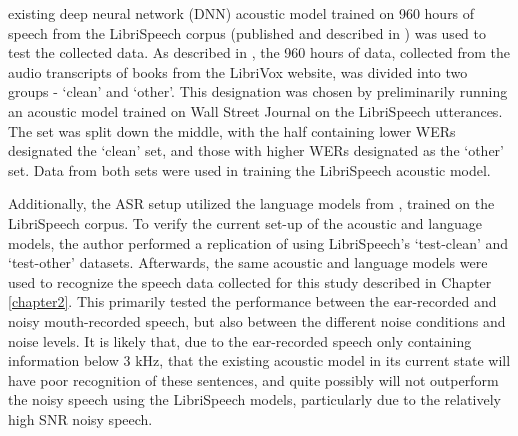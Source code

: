 \DIFdelbegin {}\DIFdelend \DIFaddbegin {}\DIFaddend existing deep neural network (DNN) acoustic model trained on 960 hours of speech from the LibriSpeech corpus (published and described in \cite{panayotov:15}) was used to test the collected data.  As described in \cite{panayotov:15}, the 960 hours of data, collected from the audio transcripts of books from the LibriVox website, was divided into two groups - `clean' and `other'.  This designation was chosen by preliminarily running an acoustic model trained on Wall Street Journal \DIFdelbegin {}\DIFdelend \DIFaddbegin {}\DIFaddend on the LibriSpeech utterances. The set was split down the middle, with the half containing lower WERs designated \DIFdelbegin {}\DIFdelend \DIFaddbegin {}\DIFaddend the `clean' set, and those with higher WERs designated as the `other' set.  Data from both sets were used in training the LibriSpeech acoustic model.  \DIFaddbegin {}\DIFaddend 

Additionally, the ASR setup utilized the language models from \cite{panayotov:15}, trained on the LibriSpeech corpus.  To verify the current set-up of the acoustic and language models, the author performed a replication of \cite{panayotov:15} \DIFdelbegin {}\DIFdelend using LibriSpeech's `test-clean' and `test-other' datasets.  Afterwards, the same acoustic and language models were used to recognize the speech data collected for this study described in Chapter \ref{chapter2}. This primarily tested the performance between the ear-recorded and noisy mouth-recorded speech, but also between the different noise conditions and noise levels.  
\DIFdelbegin {}\DIFdelend %
It is likely that, due to the ear-recorded speech only containing information below 3 kHz, that the existing acoustic model in its current state will have poor recognition of these sentences, and quite possibly will not outperform the noisy speech using the LibriSpeech models, particularly due to the relatively high SNR noisy speech.

